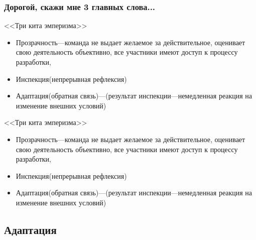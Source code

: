 \documentclass{../industrial-development}
\begin{document}
\begin{frame} \frametitle{Дорогой, скажи мне 3 главных слова...}
  \begin{block}{<<Три кита эмперизма>>}
	\begin{itemize}
 \item \alert{Прозрачность}---команда не выдает желаемое за действительное, оценивает свою деятельность объективно, все участники имеют доступ к процессу разработки, 
\item \alert{Инспекция}(непрерывная рефлексия)
\item \alert{Адаптация}(обратная связь)---(результат инспекции---немедленная реакция на изменение внешних условий)
\end{itemize} 
	\end{block}
 \end{frame} 
\lecturenotes
\begin{block}{<<Три кита эмперизма>>}
	\begin{itemize}
 \item \alert{Прозрачность}---команда не выдает желаемое за действительное, оценивает свою деятельность объективно, все участники имеют доступ к процессу разработки, 
\item \alert{Инспекция}(непрерывная рефлексия)
\item \alert{Адаптация}(обратная связь)---(результат инспекции---немедленная реакция на изменение внешних условий)
\end{itemize} 
	\end{block}

\subsection{Адаптация}
\end{document}
